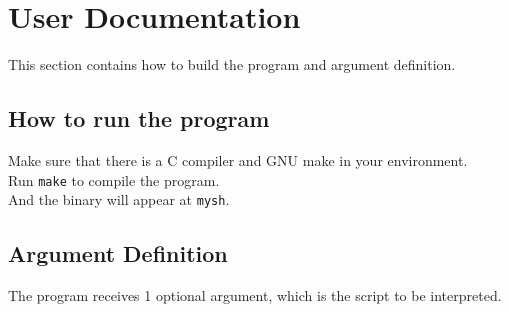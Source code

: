 \documentclass{article}
\begin{document}
\section{User Documentation}
This section contains how to build the program and argument definition.

\subsection{How to run the program}
Make sure that there is a C compiler and GNU make in your environment. \\
Run \texttt{make} to compile the program. \\
And the binary will appear at \texttt{mysh}.

\subsection{Argument Definition}
The program receives 1 optional argument, which is the script to be interpreted.
\end{document}
